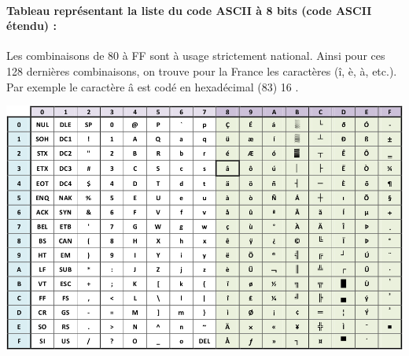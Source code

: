 \documentclass{article}
\begin{document}
\paragraph{Tableau représentant la liste du code ASCII à 8 bits (code ASCII étendu) :\\}
Les combinaisons de 80 à FF sont à usage strictement national. Ainsi pour ces 128 dernières combinaisons, on trouve
pour la France les caractères (î, è, à, etc.). Par exemple le caractère â est codé en hexadécimal (83) 16 .
\begin{center}
	\includegraphics[scale=.6]{./figures/ascii3.png}
\end{center}
\newpage
\end{document}
